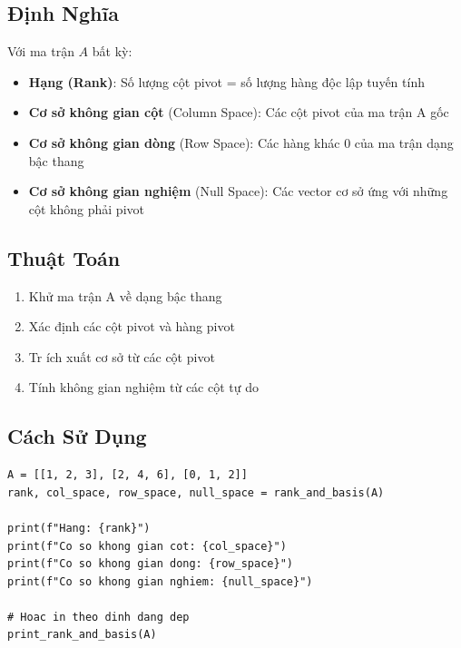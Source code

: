 \documentclass[12pt, a4paper, twoside]{article}
\begin{document}
\subsection{Định Nghĩa}

Với ma trận $A$ bất kỳ:

\begin{itemize}
    \item \textbf{Hạng (Rank)}: Số lượng cột pivot = số lượng hàng độc lập tuyến tính
    
    \item \textbf{Cơ sở không gian cột} (Column Space): Các cột pivot của ma trận A gốc
    
    \item \textbf{Cơ sở không gian dòng} (Row Space): Các hàng khác 0 của ma trận dạng bậc thang
    
    \item \textbf{Cơ sở không gian nghiệm} (Null Space): Các vector cơ sở ứng với những cột không phải pivot
\end{itemize}

\subsection{Thuật Toán}

\begin{enumerate}
    \item Khử ma trận A về dạng bậc thang
    \item Xác định các cột pivot và hàng pivot
    \item Tr ích xuất cơ sở từ các cột pivot
    \item Tính không gian nghiệm từ các cột tự do
\end{enumerate}

\subsection{Cách Sử Dụng}

\begin{lstlisting}
A = [[1, 2, 3], [2, 4, 6], [0, 1, 2]]
rank, col_space, row_space, null_space = rank_and_basis(A)

print(f"Hang: {rank}")
print(f"Co so khong gian cot: {col_space}")
print(f"Co so khong gian dong: {row_space}")
print(f"Co so khong gian nghiem: {null_space}")

# Hoac in theo dinh dang dep
print_rank_and_basis(A)
\end{lstlisting}
\end{document}
